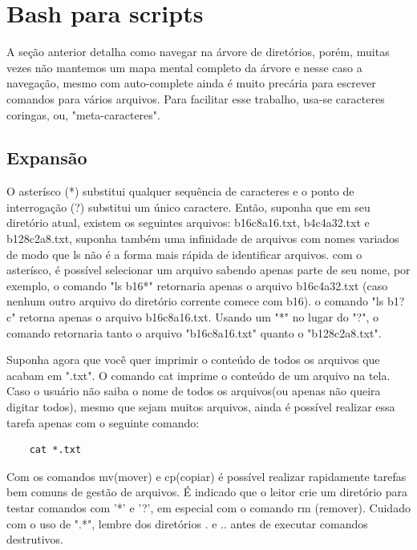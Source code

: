 \documentclass[oneside, 11 pt]{article}
\begin{document}
	\section{Bash para scripts} \label{scripts}
	
	A seção anterior detalha como navegar na árvore de diretórios, porém, muitas vezes não mantemos um mapa mental completo da árvore e nesse caso a navegação, mesmo com auto-complete ainda é muito precária para escrever comandos para vários arquivos. Para facilitar esse trabalho, usa-se caracteres coringas, ou, "meta-caracteres".
		
	\subsection{Expansão}
	
	O asterísco (*) substitui qualquer sequência de caracteres e o ponto de interrogação (?) substitui um único caractere. Então, suponha que em seu diretório atual, existem os seguintes arquivos: b16c8a16.txt, b4c4a32.txt e b128c2a8.txt, suponha também uma infinidade de arquivos com nomes variados de modo que ls não é a forma mais rápida de identificar arquivos. com o asterísco, é possível selecionar um arquivo sabendo apenas parte de seu nome, por exemplo, o comando "ls b16*" retornaria apenas o arquivo b16c4a32.txt (caso nenhum outro arquivo do diretório corrente comece com b16). o comando "ls b1?c" retorna apenas o arquivo b16c8a16.txt. Usando um "*" no lugar do "?", o comando retornaria tanto o arquivo "b16c8a16.txt" quanto o "b128c2a8.txt".
	
	Suponha agora que você quer imprimir o conteúdo de todos os arquivos que acabam em ".txt". O comando cat imprime o conteúdo de um arquivo na tela. Caso o usuário não saiba o nome de todos os arquivos(ou apenas não queira digitar todos), mesmo que sejam muitos arquivos, ainda é possível realizar essa tarefa apenas com o seguinte comando:
	\begin{lstlisting}
	cat *.txt
	\end{lstlisting}
	Com os comandos mv(mover) e cp(copiar) é possível realizar rapidamente tarefas bem comuns de gestão de arquivos. É indicado que o leitor crie um diretório para testar comandos com '*' e '?', em especial com o comando rm (remover). Cuidado com o uso de ".*", lembre dos diretórios . e .. antes de executar comandos destrutivos.
	
\end{document}
